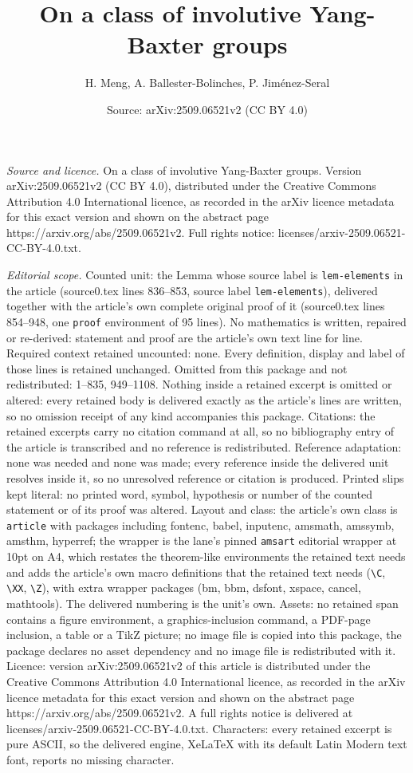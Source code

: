 \documentclass[10pt,a4paper]{amsart}
\title[On a class of involutive Yang-Baxter groups]{On a class of involutive Yang-Baxter groups}
\author{H. Meng, A. Ballester-Bolinches, P. Jim\'enez-Seral}
\date{Source: arXiv:2509.06521v2 (CC BY 4.0)}
\begin{document}
\maketitle

\noindent\emph{Source and licence.} On a class of involutive Yang-Baxter groups. Version arXiv:2509.06521v2 (CC BY 4.0), distributed under the Creative Commons Attribution 4.0 International licence, as recorded in the arXiv licence metadata for this exact version and shown on the abstract page https://arxiv.org/abs/2509.06521v2. Full rights notice: licenses/arxiv-2509.06521-CC-BY-4.0.txt.\par\smallskip

\noindent\textit{Editorial scope.} Counted unit: the Lemma whose source label is \texttt{lem-elements} in the article (source0.tex lines 836--853, source label \texttt{lem-elements}), delivered together with the article's own complete original proof of it (source0.tex lines 854--948, one \texttt{proof} environment of 95 lines). No mathematics is written, repaired or re-derived: statement and proof are the article's own text line for line. Required context retained uncounted: none. Every definition, display and label of those lines is retained unchanged. Omitted from this package and not redistributed: 1--835, 949--1108. Nothing inside a retained excerpt is omitted or altered: every retained body is delivered exactly as the article's lines are written, so no omission receipt of any kind accompanies this package. Citations: the retained excerpts carry no citation command at all, so no bibliography entry of the article is transcribed and no reference is redistributed. Reference adaptation: none was needed and none was made; every reference inside the delivered unit resolves inside it, so no unresolved reference or citation is produced. Printed slips kept literal: no printed word, symbol, hypothesis or number of the counted statement or of its proof was altered. Layout and class: the article's own class is \texttt{article} with packages including fontenc, babel, inputenc, amsmath, amssymb, amsthm, hyperref; the wrapper is the lane's pinned \texttt{amsart} editorial wrapper at 10pt on A4, which restates the theorem-like environments the retained text needs and adds the article's own macro definitions that the retained text needs (\texttt{\textbackslash C}, \texttt{\textbackslash XX}, \texttt{\textbackslash Z}), with extra wrapper packages (bm, bbm, dsfont, xspace, cancel, mathtools). The delivered numbering is the unit's own. Assets: no retained span contains a figure environment, a graphics-inclusion command, a PDF-page inclusion, a table or a TikZ picture; no image file is copied into this package, the package declares no asset dependency and no image file is redistributed with it. Licence: version arXiv:2509.06521v2 of this article is distributed under the Creative Commons Attribution 4.0 International licence, as recorded in the arXiv licence metadata for this exact version and shown on the abstract page https://arxiv.org/abs/2509.06521v2. A full rights notice is delivered at licenses/arxiv-2509.06521-CC-BY-4.0.txt. Characters: every retained excerpt is pure ASCII, so the delivered engine, XeLaTeX with its default Latin Modern text font, reports no missing character.
\end{document}
